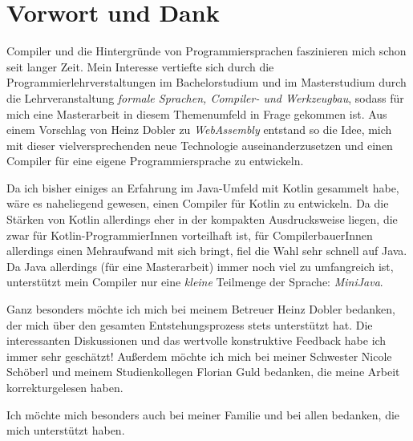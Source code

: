 \chapter{Vorwort und Dank}
 
Compiler und die Hintergründe von Programmiersprachen faszinieren mich schon seit langer Zeit. Mein Interesse vertiefte sich durch die Programmierlehrverstaltungen im Bachelorstudium und im Masterstudium durch die Lehrveranstaltung \emph{formale Sprachen, Compiler- und Werkzeugbau}, sodass für mich eine Masterarbeit in diesem Themenumfeld in Frage gekommen ist. Aus einem Vorschlag von Heinz Dobler zu \emph{WebAssembly} entstand so die Idee, mich mit dieser vielversprechenden neue Technologie auseinanderzusetzen und einen Compiler für eine eigene Programmiersprache zu entwickeln.

Da ich bisher einiges an Erfahrung im Java-Umfeld mit Kotlin gesammelt habe, wäre es naheliegend gewesen, einen Compiler für Kotlin zu entwickeln. Da die Stärken von Kotlin allerdings eher in der kompakten Ausdrucksweise liegen, die zwar für Kotlin-ProgrammierInnen vorteilhaft ist, für CompilerbauerInnen allerdings einen Mehraufwand mit sich bringt, fiel die Wahl sehr schnell auf Java. Da Java allerdings (für eine Masterarbeit) immer noch viel zu umfangreich ist, unterstützt mein Compiler nur eine \emph{kleine} Teilmenge der Sprache: \emph{MiniJava}.

Ganz besonders möchte ich mich bei meinem Betreuer Heinz Dobler bedanken, der mich über den gesamten Entstehungsprozess stets unterstützt hat. Die interessanten Diskussionen und das wertvolle konstruktive Feedback habe ich immer sehr geschätzt! Außerdem möchte ich mich bei meiner Schwester Nicole Schöberl und meinem Studienkollegen Florian Guld bedanken, die meine Arbeit korrekturgelesen haben.

Ich möchte mich besonders auch bei meiner Familie und bei allen bedanken, die mich unterstützt haben.
